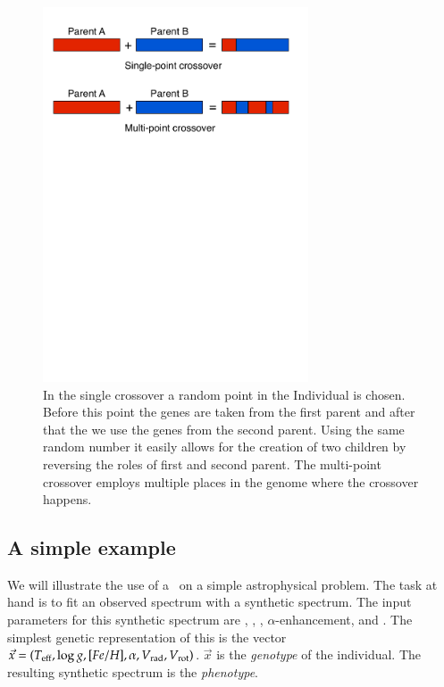 \begin{figure}[htbp] %
   \centering
   \includegraphics[width=0.7\textwidth,trim=0 18cm 0 0]{chapter_dalek/plots/crossovers.pdf} 
   \caption{In the single crossover a random point in the Individual is chosen. Before this point the genes are taken from the first parent and after that the we use the genes from the second parent. Using the same random number it easily allows for the creation of two children by reversing the roles of first and second parent. The multi-point crossover employs multiple places in the genome where the crossover happens.}
   \label{fig:crossover}
\end{figure}





\subsection{A simple example}
We will illustrate the use of a \ga\ on a simple astrophysical problem. The task at hand is to fit an observed spectrum with a synthetic spectrum. The input parameters for this synthetic spectrum are \teff, \logg, \feh, $\alpha$-enhancement, \vrad and \vrot. The simplest genetic representation of this is the vector $\vec{x} = (T_{\rm eff}, \log{g}, [Fe/H], \alpha, \hbox{$V_{\textrm{rad}}$}, \hbox{$V_{\textrm{rot}}$})$. $\vec{x}$ is the \textit{genotype} of the individual. The resulting synthetic spectrum is the \textit{phenotype}. 

